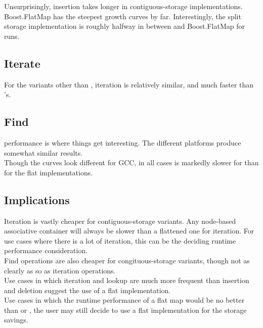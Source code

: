 
Unsurprisingly, insertion takes longer in contiguous-storage implementations.
Boost.FlatMap has the steepest growth curves by far.  Interestingly, the split
storage implementation is roughly halfway in between  and
Boost.FlatMap for  runs.

\subsection{Iterate}


For the variants other than , iteration is relatively similar, and
much faster than 's.

\subsection{Find}


 performance is where things get interesting.  The different
platforms produce somewhat similar results.\\

Though the curves look different for GCC, in all cases  is
markedly slower for  than for the flat implementations.


\subsection{Implications}

Iteration is vastly cheaper for contiguous-storage variants.  Any node-based
associative container will always be slower than a flattened one for
iteration.  For use cases where there is a lot of iteration, this can be the
deciding runtime performance consideration.\\

Find operations are also cheaper for congituous-storage variants, though not
as clearly as so as iteration operations.\\

Use cases in which iteration and lookup are much more frequent than insertion
and deletion suggest the use of a flat implementation.\\

Use cases in which the runtime performance of a flat map would be no better
than  or , the user may still decide to use a
flat implementation for the storage savings.
